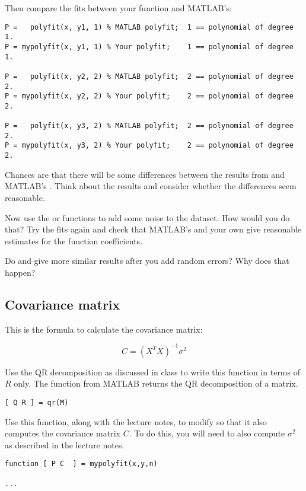 Then compare the fits between your function and MATLAB's:

\begin{verbatim}
P =   polyfit(x, y1, 1) % MATLAB polyfit;  1 == polynomial of degree 1.
P = mypolyfit(x, y1, 1) % Your polyfit;    1 == polynomial of degree 1.

P =   polyfit(x, y2, 2) % MATLAB polyfit;  2 == polynomial of degree 2.
P = mypolyfit(x, y2, 2) % Your polyfit;    2 == polynomial of degree 2.

P =   polyfit(x, y3, 2) % MATLAB polyfit;  2 == polynomial of degree 2.
P = mypolyfit(x, y3, 2) % Your polyfit;    2 == polynomial of degree 2.
\end{verbatim}

Chances are that there will be some differences between the results from
 and MATLAB's . Think about the results and
consider whether the differences seem reasonable.

Now use the  or  functions to add some noise
to the dataset. How would you do that? Try the fits again and check
that MATLAB's  and your own  give
reasonable estimates for the function coefficients.

Do  and  give more similar results after
you add random errors? Why does that happen?

\subsection{Covariance matrix}

This is the formula to calculate the covariance matrix:

\[
	C = (X^T X)^{-1} \sigma^2
\]

Use the QR decomposition as discussed in class to write this function
in terms of $R$ only. The  function from MATLAB returns the
QR decomposition of a matrix.

\begin{verbatim}
[ Q R ] = qr(M)
\end{verbatim}

Use this function, along with the lecture notes, to modify 
so that it also computes the covariance matrix $C$. To do this, you will
need to also compute $\sigma^2$ as described in the lecture notes.

\begin{verbatim}
function [ P C  ] = mypolyfit(x,y,n)

...
\end{verbatim}

